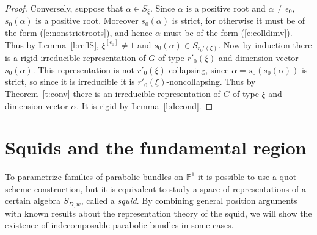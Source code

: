 \documentclass{amsart}
\theoremstyle{plain}
\theoremstyle{definition}
\theoremstyle{remark}
\newcommand{\PP}{\mathbb{P}}
\begin{document}
\begin{proof}
Conversely, suppose that $\alpha\in S_\xi$. Since $\alpha$ is a positive root
and $\alpha\neq\epsilon_0$, $s_0(\alpha)$ is a positive root. Moreover $s_0(\alpha)$ is strict,
for otherwise it must be of the form (\ref{e:nonstrictroots}), and hence
$\alpha$ must be of the form (\ref{e:colldimv}).
Thus by Lemma~\ref{l:reflS}, $\xi^{[\epsilon_0]}\neq 1$ and
$s_0(\alpha)\in S_{r_0'(\xi)}$. Now by induction there is
a rigid irreducible representation of $G$ of
type $r'_0(\xi)$ and dimension vector $s_0(\alpha)$.
This representation is not $r'_0(\xi)$-collapsing,
since $\alpha = s_0(s_0(\alpha))$ is strict, so since it is
irreducible it is $r'_0(\xi)$-noncollapsing. Thus by
Theorem~\ref{t:conv} there is an irreducible representation
of $G$ of type $\xi$ and dimension vector $\alpha$.
It is rigid by Lemma~\ref{l:decond}.
\end{proof}











\section{Squids and the fundamental region}\label{s:squid}
To parametrize families of parabolic bundles on $\PP^1$
it is possible to use a quot-scheme construction, but
it is equivalent to study a space of
representations of a certain algebra $S_{D,w}$,
called a \emph{squid}. By combining general position arguments with
known results about the representation theory of the squid,
we will show the existence of indecomposable parabolic bundles in some cases.
\end{document}
